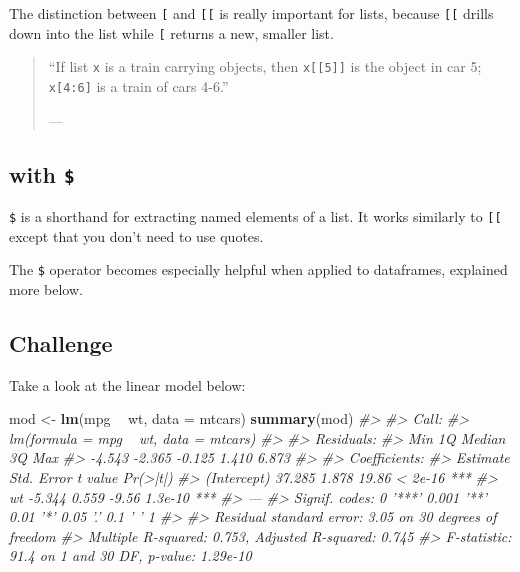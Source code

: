 \documentclass[]{book}
\newenvironment{Shaded}{\begin{snugshade}}{\end{snugshade}}
\newcommand{\KeywordTok}[1]{\textcolor[rgb]{0.13,0.29,0.53}{\textbf{#1}}}
\newcommand{\DataTypeTok}[1]{\textcolor[rgb]{0.13,0.29,0.53}{#1}}
\newcommand{\StringTok}[1]{\textcolor[rgb]{0.31,0.60,0.02}{#1}}
\newcommand{\CommentTok}[1]{\textcolor[rgb]{0.56,0.35,0.01}{\textit{#1}}}
\newcommand{\OperatorTok}[1]{\textcolor[rgb]{0.81,0.36,0.00}{\textbf{#1}}}
\newcommand{\NormalTok}[1]{#1}
\begin{document}
The distinction between \texttt{{[}} and \texttt{{[}{[}} is really
important for lists, because \texttt{{[}{[}} drills down into the list
while \texttt{{[}} returns a new, smaller list.

\begin{quote}
``If list \texttt{x} is a train carrying objects, then
\texttt{x{[}{[}5{]}{]}} is the object in car 5; \texttt{x{[}4:6{]}} is a
train of cars 4-6.''

--- \citet{RLangTip}
\end{quote}

\subsection{\texorpdfstring{with \texttt{\$}}{with \$}}\label{with-2}

\texttt{\$} is a shorthand for extracting named elements of a list. It
works similarly to \texttt{{[}{[}} except that you don't need to use
quotes.

\begin{Shaded}
\end{Shaded}

The \texttt{\$} operator becomes especially helpful when applied to
dataframes, explained more below.

\subsection{Challenge}\label{challenge-2}

Take a look at the linear model below:

\begin{Shaded}
\begin{Highlighting}[]
\NormalTok{mod <-}\StringTok{ }\KeywordTok{lm}\NormalTok{(mpg }\OperatorTok{~}\StringTok{ }\NormalTok{wt, }\DataTypeTok{data =}\NormalTok{ mtcars)}
\KeywordTok{summary}\NormalTok{(mod)}
\CommentTok{#> }
\CommentTok{#> Call:}
\CommentTok{#> lm(formula = mpg ~ wt, data = mtcars)}
\CommentTok{#> }
\CommentTok{#> Residuals:}
\CommentTok{#>    Min     1Q Median     3Q    Max }
\CommentTok{#> -4.543 -2.365 -0.125  1.410  6.873 }
\CommentTok{#> }
\CommentTok{#> Coefficients:}
\CommentTok{#>             Estimate Std. Error t value Pr(>|t|)    }
\CommentTok{#> (Intercept)   37.285      1.878   19.86  < 2e-16 ***}
\CommentTok{#> wt            -5.344      0.559   -9.56  1.3e-10 ***}
\CommentTok{#> ---}
\CommentTok{#> Signif. codes:  0 '***' 0.001 '**' 0.01 '*' 0.05 '.' 0.1 ' ' 1}
\CommentTok{#> }
\CommentTok{#> Residual standard error: 3.05 on 30 degrees of freedom}
\CommentTok{#> Multiple R-squared:  0.753,  Adjusted R-squared:  0.745 }
\CommentTok{#> F-statistic: 91.4 on 1 and 30 DF,  p-value: 1.29e-10}
\end{Highlighting}
\end{Shaded}
\end{document}
